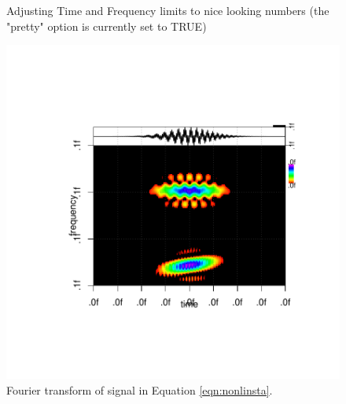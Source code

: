 \documentclass[12pt]{article}
\begin{document}
\begin{figure}[ht]
\begin{center}
\begin{Schunk}
\begin{Soutput}
Adjusting Time and Frequency limits to nice looking numbers (the "pretty" option is currently set to TRUE)
\end{Soutput}
\end{Schunk}
\includegraphics{interesting_signals-nonlinstaft}
\end{center}
\caption{Fourier transform of signal in Equation \ref{eqn:nonlinsta}.}
\label{fig:nonlinstaft}
\end{figure}
\end{document}
